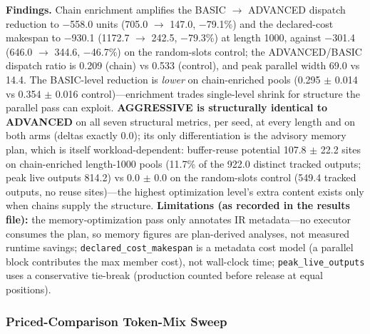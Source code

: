 \documentclass[
  11pt,
]{article}
\begin{document}
\textbf{Findings.} Chain enrichment amplifies the BASIC \(\rightarrow\)
ADVANCED dispatch reduction to −558.0 units (705.0 \(\rightarrow\)
147.0, −79.1\%) and the declared-cost makespan to −930.1 (1172.7
\(\rightarrow\) 242.5, −79.3\%) at length 1000, against −301.4 (646.0
\(\rightarrow\) 344.6, −46.7\%) on the random-slots control; the
ADVANCED/BASIC dispatch ratio is 0.209 (chain) vs 0.533 (control), and
peak parallel width 69.0 vs 14.4. The BASIC-level reduction is
\emph{lower} on chain-enriched pools (0.295 \(\pm\) 0.014 vs 0.354
\(\pm\) 0.016 control)---enrichment trades single-level shrink for
structure the parallel pass can exploit. \textbf{AGGRESSIVE is
structurally identical to ADVANCED} on all seven structural metrics, per
seed, at every length and on both arms (deltas exactly 0.0); its only
differentiation is the advisory memory plan, which is itself
workload-dependent: buffer-reuse potential 107.8 \(\pm\) 22.2 sites on
chain-enriched length-1000 pools (11.7\% of the 922.0 distinct tracked
outputs; peak live outputs 814.2) vs 0.0 \(\pm\) 0.0 on the random-slots
control (549.4 tracked outputs, no reuse sites)---the highest
optimization level's extra content exists only when chains supply the
structure. \textbf{Limitations (as recorded in the results file):} the
memory-optimization pass only annotates IR metadata---no executor
consumes the plan, so memory figures are plan-derived analyses, not
measured runtime savings; \texttt{declared\_cost\_makespan} is a
metadata cost model (a parallel block contributes the max member cost),
not wall-clock time; \texttt{peak\_live\_outputs} uses a conservative
tie-break (production counted before release at equal positions).

\subsubsection{Priced-Comparison Token-Mix
Sweep}\label{priced-comparison-token-mix-sweep}
\end{document}
